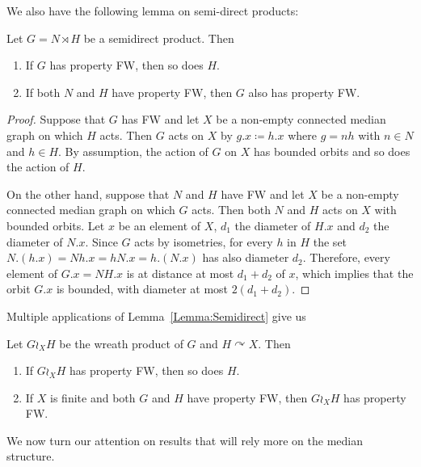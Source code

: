 We also have the following lemma on semi-direct products:
\begin{lem}\label{Lemma:Semidirect}
Let $G=N\rtimes H$ be a semidirect product. Then
\begin{enumerate}
\item
If $G$ has property FW, then so does $H$.
\item
If both $N$ and $H$ have property FW, then $G$ also has property FW.
\end{enumerate}
\end{lem}
\begin{proof}
Suppose that $G$ has FW and let $X$ be a non-empty connected median graph on which $H$ acts.
Then $G$ acts on $X$ by $g.x\coloneqq h.x$ where $g=nh$ with $n\in N$ and $h\in H$.
By assumption, the action of $G$ on $X$ has bounded orbits and so does the action of $H$.

On the other hand, suppose that $N$ and $H$ have FW and let $X$ be a non-empty connected median graph on which $G$ acts.
Then both $N$ and $H$ acts on $X$ with bounded orbits.
Let $x$ be an element of $X$, $d_1$ the diameter of $H.x$ and $d_2$ the diameter of $N.x$.
Since $G$ acts by isometries, for every $h$ in $H$ the set $N.(h.x)=Nh.x=hN.x=h.(N.x)$ has also diameter $d_2$.
Therefore, every element of $G.x=NH.x$ is at distance at most $d_1+d_2$ of $x$, which implies that the orbit $G.x$ is bounded, with diameter at most $2(d_1+d_2)$.
\end{proof}
Multiple applications of Lemma~\ref{Lemma:Semidirect} give us
\begin{cor}\label{Cor:Wreath}
Let $G\wr_X H$ be the wreath product of $G$ and $H\curvearrowright X$.
Then
\begin{enumerate}
\item
If $G\wr_X H$ has property FW, then so does $H$.
\item
If $X$ is finite and both $G$ and $H$ have property FW, then $G\wr_X H$ has property FW.
\end{enumerate}
\end{cor}







We now turn our attention on results that will rely more on the median structure.

